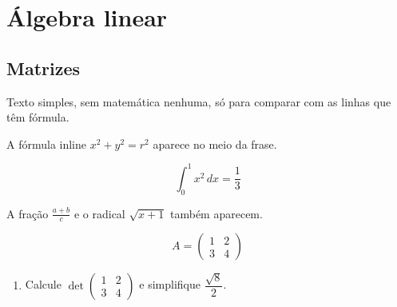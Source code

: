 \documentclass[11pt,oneside]{book}
\begin{document}
\chapter{Álgebra linear}
\section{Matrizes}
Texto simples, sem matemática nenhuma, só para comparar com as linhas que têm fórmula.

A fórmula inline $x^2 + y^2 = r^2$ aparece no meio da frase.

\[ \int_0^1 x^2\,dx = \frac{1}{3} \]

A fração $\frac{a+b}{c}$ e o radical $\sqrt{x+1}$ também aparecem.

\[ A = \begin{pmatrix} 1 & 2 \\ 3 & 4 \end{pmatrix} \]

\blocoexercicios
\begin{enumerate}[label=\textbf{\arabic*.}]
\item Calcule $\det\begin{pmatrix} 1 & 2 \\ 3 & 4 \end{pmatrix}$ e simplifique $\dfrac{\sqrt{8}}{2}$.
\end{enumerate}
\end{document}
